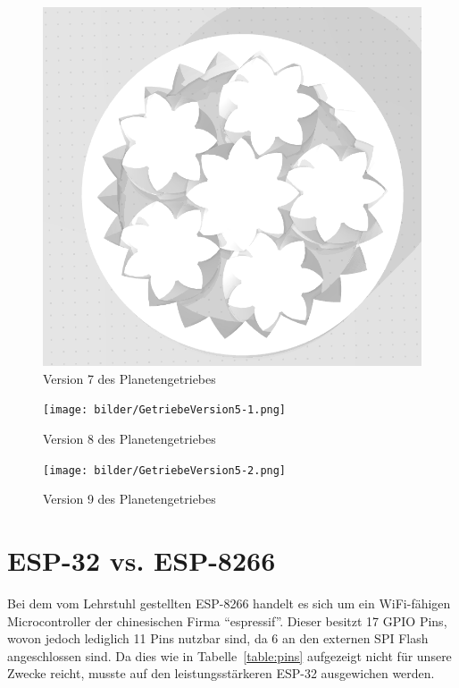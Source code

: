 \begin{figure}[!ht]
	\centering
	\includegraphics[width=\textwidth]{bilder/GetriebeVersion4-4.png}
	\caption{Version 7 des Planetengetriebes}
	\label{bild:gearversion4-4}
\end{figure}
\begin{figure}[!ht]
	\centering
	\texttt{[image: bilder/GetriebeVersion5-1.png]}
	\caption{Version 8 des Planetengetriebes \cite{link:planetgear5-1}}
	\label{bild:gearversion5-1}
\end{figure}
\begin{figure}[!ht]
	\centering
	\texttt{[image: bilder/GetriebeVersion5-2.png]}
	\caption{Version 9 des Planetengetriebes \cite{link:planetgear5-2}}
	\label{bild:gearversion5-2}
\end{figure}

\section{ESP-32 vs. ESP-8266}
Bei dem vom Lehrstuhl gestellten ESP-8266 handelt es sich um ein WiFi-fähigen Microcontroller der chinesischen Firma ``espressif''.
Dieser besitzt 17 GPIO Pins, wovon jedoch lediglich 11 Pins nutzbar sind, da 6 an den externen SPI Flash angeschlossen sind.
Da dies wie in Tabelle~\ref{table:pins} aufgezeigt nicht für unsere Zwecke reicht, musste auf den leistungsstärkeren ESP-32 ausgewichen werden.

